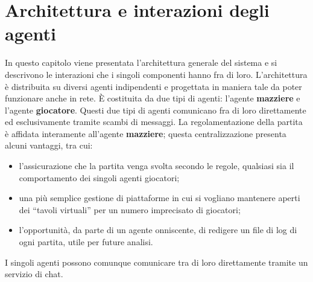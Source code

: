 \chapter*{Architettura e interazioni degli agenti}
\graphicspath{{Chapter3/Chapter3Figs/PNG/}{Chapter3/Chapter3Figs/PDF/}{Chapter3/Chapter3Figs/}}

In questo capitolo viene presentata l'architettura generale del sistema e si descrivono le interazioni che i singoli componenti hanno fra di loro.
L'architettura è distribuita su diversi agenti indipendenti e progettata in maniera tale da poter funzionare anche in rete.
È costituita da due tipi di agenti: l'agente \textbf{mazziere} e l'agente \textbf{giocatore}.
Questi due tipi di agenti comunicano fra di loro direttamente ed esclusivamente tramite scambi di messaggi.
La regolamentazione della partita è affidata interamente all'agente \textbf{mazziere}; questa centralizzazione presenta alcuni vantaggi, tra cui:
\begin{itemize}
   \item l'assicurazione che la partita venga svolta secondo le regole, qualsiasi sia il comportamento dei singoli agenti giocatori;
   \item una più semplice gestione di piattaforme in cui si vogliano mantenere aperti dei ``tavoli virtuali'' per un numero imprecisato di giocatori;
   \item l'opportunità, da parte di un agente onniscente, di redigere un file di log di ogni partita, utile per future analisi.
\end{itemize}

I singoli agenti possono comunque comunicare tra di loro direttamente tramite un servizio di chat.
